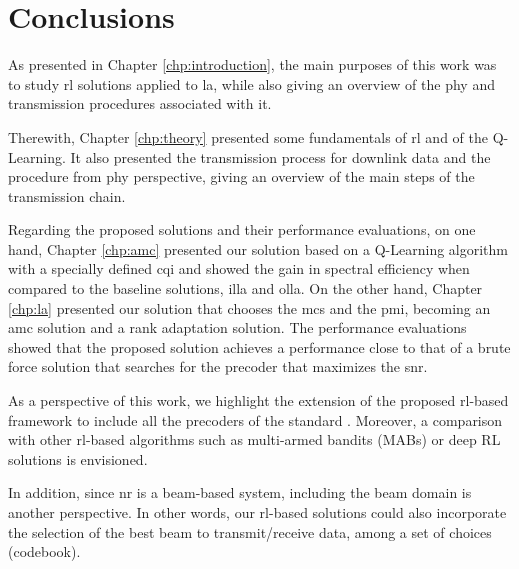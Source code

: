 \glsresetall
%

\chapter{Conclusions}%
\label{chp:conclusion}

As presented in Chapter \ref{chp:introduction}, the main purposes of this work was to study \gls{rl} solutions applied to \gls{la}, while also giving an overview of the \gls{phy} and transmission procedures associated with it.

Therewith, Chapter \ref{chp:theory} presented some fundamentals of \gls{rl} and of the Q-Learning.
%
It also presented the transmission process for downlink data and the procedure from \gls{phy} perspective, giving an overview of the main steps of the transmission chain.

Regarding the proposed solutions and their performance evaluations, on one hand, Chapter \ref{chp:amc} presented our solution based on a Q-Learning algorithm with a specially defined \gls{cqi} and showed the gain in spectral efficiency when compared to the baseline solutions, \gls{illa} and \gls{olla}.
%
On the other hand, Chapter \ref{chp:la} presented our solution that chooses the \gls{mcs} and the \gls{pmi}, becoming an \gls{amc} solution and a rank adaptation solution. The performance evaluations showed that the proposed solution achieves a performance close to that of a brute force solution that searches for the precoder that maximizes the \gls{snr}.

As a perspective of this work, we highlight the extension of the proposed \gls{rl}-based framework to include all the precoders of the standard \cite{3gpp.38.214}.
%
Moreover, a comparison with other \gls{rl}-based algorithms such as multi-armed bandits (MABs) \cite{zhou2015survey} or deep RL solutions \cite{DeepRLSurvey} is envisioned.

In addition, since \gls{nr} is a beam-based system, including the beam domain is another perspective.
%
In other words, our \gls{rl}-based solutions could also incorporate the selection of the best beam to transmit/receive data, among a set of choices (codebook).
